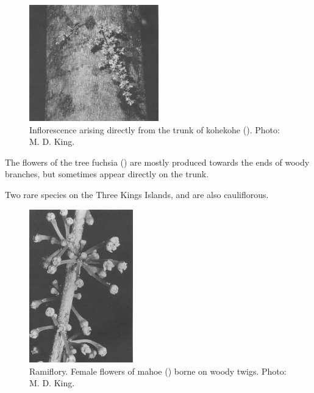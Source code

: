 \begin{figure}
	\includegraphics[width=0.5\textwidth]{graphics/figure16infloresence.jpg}
	\centering
	\caption[Inflorescence arising directly from the trunk of kohekohe]{Inflorescence arising directly from the trunk of kohekohe ().
	Photo:  M. D. King.}%
	\label{fig:16infloresence}
\end{figure}

The flowers of the tree fuchsia () are mostly produced towards the ends of woody branches, but sometimes appear directly on the trunk.

Two rare species on the Three Kings Islands,  and  are also cauliflorous.

\begin{figure}
	\includegraphics[width=0.4\textwidth]{graphics/figure17mahoe.jpg}
	\centering
	\caption[Ramiflory.
	Female flowers of mahoe]{Ramiflory.
	Female flowers of mahoe () borne on woody twigs.
	Photo:  M. D. King.}%
	\label{fig:17mahoe}
\end{figure}

